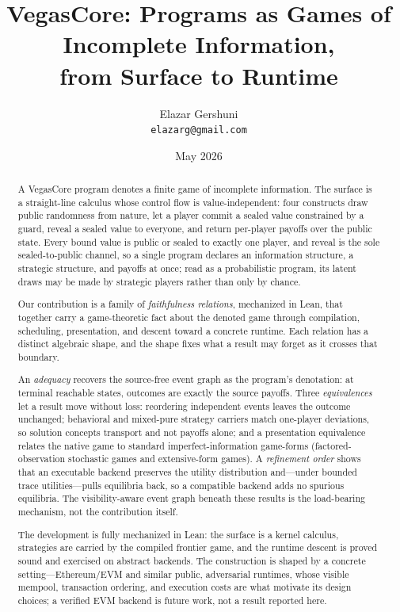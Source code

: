 \documentclass[11pt]{article}
\title{VegasCore: Programs as Games of Incomplete Information,\\
       from Surface to Runtime}
\author{Elazar Gershuni\\\texttt{elazarg@gmail.com}}
\date{May 2026}
\begin{document}
\maketitle

\begin{abstract}
A VegasCore program denotes a finite game of incomplete information.  The
surface is a straight-line calculus whose control flow is value-independent:
four constructs draw public randomness from nature, let a player commit a
sealed value constrained by a guard, reveal a sealed value to everyone, and
return per-player payoffs over the public state.  Every bound value is public
or sealed to exactly one player, and reveal is the sole sealed-to-public
channel, so a single program declares an information structure, a strategic
structure, and payoffs at once; read as a probabilistic program, its latent
draws may be made by strategic players rather than only by chance.

Our contribution is a family of \emph{faithfulness relations}, mechanized in
Lean, that together carry a game-theoretic fact about the denoted game through
compilation, scheduling, presentation, and descent toward a concrete runtime.
Each relation has a distinct algebraic shape, and the shape fixes what a result
may forget as it crosses that boundary.

An \emph{adequacy} recovers the source-free event graph as the program's
denotation: at terminal reachable states, outcomes are exactly the source
payoffs.  Three \emph{equivalences} let a result move without loss: reordering
independent events leaves the outcome unchanged; behavioral and mixed-pure
strategy carriers match one-player deviations, so solution concepts transport
and not payoffs alone; and a presentation equivalence relates the native game to
standard imperfect-information game-forms (factored-observation stochastic games
and extensive-form games).  A \emph{refinement order} shows that an executable
backend preserves the utility distribution and---under bounded trace
utilities---pulls equilibria back, so a compatible backend adds no spurious
equilibria.  The visibility-aware event graph beneath these results is the
load-bearing mechanism, not the contribution itself.

The development is fully mechanized in Lean: the surface is
a kernel calculus, strategies are carried by the compiled frontier game, and
the runtime descent is proved sound and exercised on abstract backends.  The
construction is shaped by a concrete
setting---Ethereum/EVM and similar public,
adversarial runtimes, whose visible mempool, transaction ordering, and
execution costs are what motivate its design choices; a verified EVM backend is
future work, not a result reported here.
\end{abstract}
\end{document}
